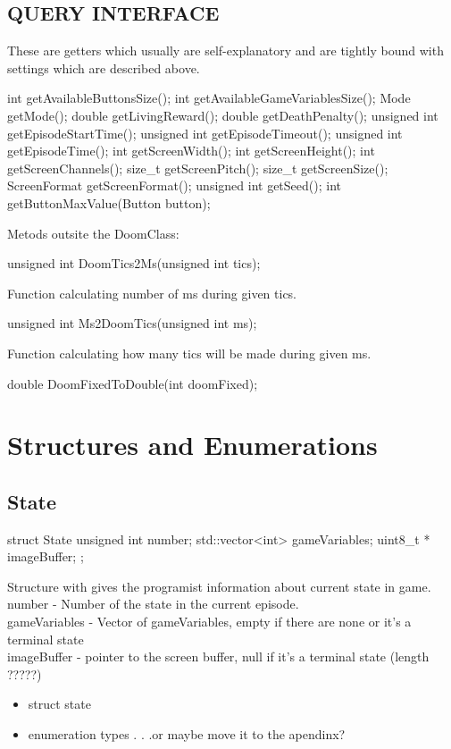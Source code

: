 \subsection{QUERY INTERFACE}
These are getters which usually are self-explanatory and are tightly bound with settings which are described above.
  \begin{clinee}
int getAvailableButtonsSize();
int getAvailableGameVariablesSize();
Mode getMode();
double getLivingReward();
double getDeathPenalty();
unsigned int getEpisodeStartTime();
unsigned int getEpisodeTimeout();
unsigned int getEpisodeTime();
int getScreenWidth();
int getScreenHeight();
int getScreenChannels();
size_t getScreenPitch();
size_t getScreenSize();
ScreenFormat getScreenFormat();
unsigned int getSeed();
int getButtonMaxValue(Button button);
\end{clinee}
Metods outsite the DoomClass:
\begin{clinee}
unsigned int DoomTics2Ms(unsigned int tics);
\end{clinee}
Function calculating number of ms during given tics.
\begin{clinee}
unsigned int Ms2DoomTics(unsigned int ms);
\end{clinee}
Function calculating how many tics will be made during given ms.
\begin{clinee}
double DoomFixedToDouble(int doomFixed);
\end{clinee}

\section{Structures and Enumerations}
\subsection{State}	
\begin{clinee}
	struct State {
	    unsigned int number; 
	    std::vector<int> gameVariables;
	    uint8_t * imageBuffer;
	};
	\end{clinee}
Structure with gives the programist information about current state in game.\\
number - Number of the state in the current episode.\\
gameVariables - Vector of gameVariables, empty if there are none or it's a terminal state\\
imageBuffer - pointer to the screen buffer, null if it's a terminal state (length ?????)
\begin{itemize}
\item struct state
\item enumeration types . . .or maybe move it to the apendinx?
\end{itemize}

